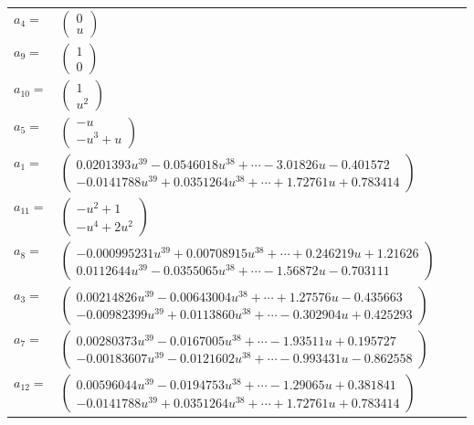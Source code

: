 \documentclass[1p]{elsarticle_modified}
\theoremstyle{definition}
\begin{document}
\begin{tabular}{m{7pt} m{180pt} m{7pt} m{180pt} }
\flushright $a_{4}=$&$\begin{pmatrix}0\\u\end{pmatrix}$ \\
\flushright $a_{9}=$&$\begin{pmatrix}1\\0\end{pmatrix}$ \\
\flushright $a_{10}=$&$\begin{pmatrix}1\\u^2\end{pmatrix}$ \\
\flushright $a_{5}=$&$\begin{pmatrix}- u\\- u^3+u\end{pmatrix}$ \\
\flushright $a_{1}=$&$\begin{pmatrix}0.0201393 u^{39}-0.0546018 u^{38}+\cdots-3.01826 u-0.401572\\-0.0141788 u^{39}+0.0351264 u^{38}+\cdots+1.72761 u+0.783414\end{pmatrix}$ \\
\flushright $a_{11}=$&$\begin{pmatrix}- u^2+1\\- u^4+2 u^2\end{pmatrix}$ \\
\flushright $a_{8}=$&$\begin{pmatrix}-0.000995231 u^{39}+0.00708915 u^{38}+\cdots+0.246219 u+1.21626\\0.0112644 u^{39}-0.0355065 u^{38}+\cdots-1.56872 u-0.703111\end{pmatrix}$ \\
\flushright $a_{3}=$&$\begin{pmatrix}0.00214826 u^{39}-0.00643004 u^{38}+\cdots+1.27576 u-0.435663\\-0.00982399 u^{39}+0.0113860 u^{38}+\cdots-0.302904 u+0.425293\end{pmatrix}$ \\
\flushright $a_{7}=$&$\begin{pmatrix}0.00280373 u^{39}-0.0167005 u^{38}+\cdots-1.93511 u+0.195727\\-0.00183607 u^{39}-0.0121602 u^{38}+\cdots-0.993431 u-0.862558\end{pmatrix}$ \\
\flushright $a_{12}=$&$\begin{pmatrix}0.00596044 u^{39}-0.0194753 u^{38}+\cdots-1.29065 u+0.381841\\-0.0141788 u^{39}+0.0351264 u^{38}+\cdots+1.72761 u+0.783414\end{pmatrix}$ \\

\end{tabular}
\end{document}
